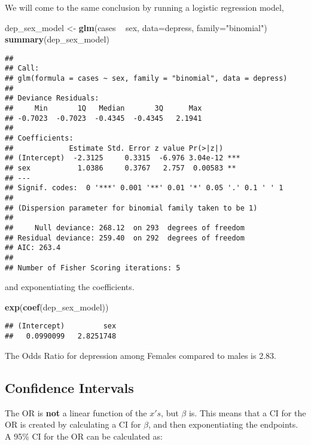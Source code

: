 \documentclass[]{article}
\newenvironment{Shaded}{\begin{snugshade}}{\end{snugshade}}
\newcommand{\KeywordTok}[1]{\textcolor[rgb]{0.13,0.29,0.53}{\textbf{{#1}}}}
\newcommand{\DataTypeTok}[1]{\textcolor[rgb]{0.13,0.29,0.53}{{#1}}}
\newcommand{\StringTok}[1]{\textcolor[rgb]{0.31,0.60,0.02}{{#1}}}
\newcommand{\NormalTok}[1]{{#1}}
\begin{document}
We will come to the same conclusion by running a logistic regression
model,

\begin{Shaded}
\begin{Highlighting}[]
\NormalTok{dep_sex_model <-}\StringTok{ }\KeywordTok{glm}\NormalTok{(cases ~}\StringTok{ }\NormalTok{sex, }\DataTypeTok{data=}\NormalTok{depress, }\DataTypeTok{family=}\StringTok{"binomial"}\NormalTok{)}
\KeywordTok{summary}\NormalTok{(dep_sex_model)}
\end{Highlighting}
\end{Shaded}

\begin{verbatim}
## 
## Call:
## glm(formula = cases ~ sex, family = "binomial", data = depress)
## 
## Deviance Residuals: 
##     Min       1Q   Median       3Q      Max  
## -0.7023  -0.7023  -0.4345  -0.4345   2.1941  
## 
## Coefficients:
##             Estimate Std. Error z value Pr(>|z|)    
## (Intercept)  -2.3125     0.3315  -6.976 3.04e-12 ***
## sex           1.0386     0.3767   2.757  0.00583 ** 
## ---
## Signif. codes:  0 '***' 0.001 '**' 0.01 '*' 0.05 '.' 0.1 ' ' 1
## 
## (Dispersion parameter for binomial family taken to be 1)
## 
##     Null deviance: 268.12  on 293  degrees of freedom
## Residual deviance: 259.40  on 292  degrees of freedom
## AIC: 263.4
## 
## Number of Fisher Scoring iterations: 5
\end{verbatim}

and exponentiating the coefficients.

\begin{Shaded}
\begin{Highlighting}[]
\KeywordTok{exp}\NormalTok{(}\KeywordTok{coef}\NormalTok{(dep_sex_model))}
\end{Highlighting}
\end{Shaded}

\begin{verbatim}
## (Intercept)         sex 
##   0.0990099   2.8251748
\end{verbatim}

The Odds Ratio for depression among Females compared to males is 2.83.

\subsection{Confidence Intervals}\label{confidence-intervals}

The OR is \textbf{not} a linear function of the \(x's\), but \(\beta\)
is. This means that a CI for the OR is created by calculating a CI for
\(\beta\), and then exponentiating the endpoints. A 95\% CI for the OR
can be calculated as:
\end{document}
